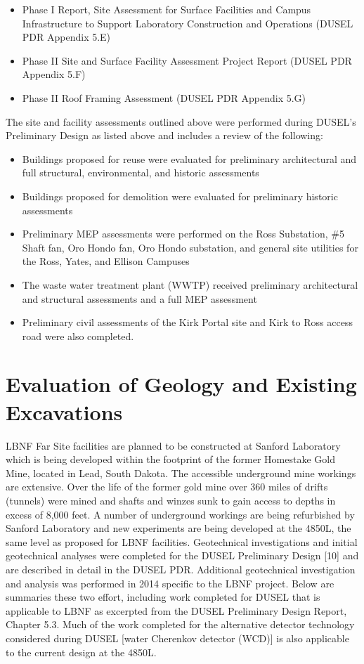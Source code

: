 \begin{itemize}
 \item Phase I Report, Site Assessment for Surface Facilities and Campus Infrastructure to Support Laboratory Construction and Operations (DUSEL PDR Appendix 5.E)
 \item Phase II Site and Surface Facility Assessment Project Report (DUSEL PDR Appendix 5.F)
 \item Phase II Roof Framing Assessment (DUSEL PDR Appendix 5.G)
     \end{itemize}
 The site and facility assessments outlined above were performed during DUSEL's Preliminary Design as listed above and includes a review of the following: 
     \begin{itemize} 
\item Buildings proposed for reuse were evaluated for preliminary architectural and full structural, environmental, and historic assessments
\item Buildings proposed for demolition were evaluated for preliminary historic assessments
\item Preliminary MEP assessments were performed on the Ross Substation, \#5 Shaft fan, Oro Hondo fan, Oro Hondo substation, and general site utilities for the Ross, Yates, and Ellison Campuses
 \item The waste water treatment plant (WWTP) received preliminary architectural and structural assessments and a full MEP assessment
  
 \item Preliminary civil assessments of the Kirk Portal site and Kirk to Ross access road were also completed.
 \end{itemize}


\section{Evaluation of Geology and Existing Excavations}
\label{sec:fscf-site-cond-geo}

LBNF Far Site facilities are planned to be constructed at Sanford Laboratory which is being developed within the footprint of the former Homestake Gold Mine, located in Lead, South Dakota. The accessible underground mine workings are extensive. Over the life of the former gold mine over 360 miles of drifts (tunnels) were mined and shafts and winzes sunk to gain access to depths in excess of 8,000 feet. A number of underground workings are being refurbished by Sanford Laboratory and new experiments are being developed at the 4850L, the same level as proposed for LBNF facilities. Geotechnical investigations and initial geotechnical analyses were completed for the DUSEL Preliminary Design [10] and are described in detail in the DUSEL PDR. Additional geotechnical investigation and analysis was performed in 2014 specific to the LBNF project.  Below are summaries these two effort, including work completed for DUSEL that is applicable to LBNF as excerpted from the DUSEL Preliminary Design Report, Chapter 5.3. Much of the work completed for the alternative detector technology considered during DUSEL [water Cherenkov detector (WCD)] is also applicable to the current design at the 4850L.  


